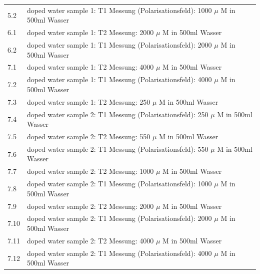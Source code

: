 \begin{tabular}{ll}
           5.2 & doped water sample 1: T1 Messung (Polarisationsfeld): 1000 $\mu$ M in 500ml Wasser \\

           6.1 & doped water sample 1: T2 Messung: 2000 $\mu$ M in 500ml Wasser \\
    
           6.2 & doped water sample 1: T1 Messung (Polarisationsfeld): 2000 $\mu$ M in 500ml Wasser \\

           7.1 & doped water sample 1: T2 Messung: 4000 $\mu$ M in 500ml Wasser \\
    
           7.2 & doped water sample 1: T1 Messung (Polarisationsfeld): 4000 $\mu$ M in 500ml Wasser \\

           7.3 & doped water sample 1: T2 Messung: 250 $\mu$ M in 500ml Wasser \\
    
           7.4 & doped water sample 2: T1 Messung (Polarisationsfeld): 250 $\mu$ M in 500ml Wasser \\
    
           7.5 & doped water sample 2: T2 Messung: 550 $\mu$ M in 500ml Wasser \\
    
           7.6 & doped water sample 2: T1 Messung (Polarisationsfeld): 550 $\mu$ M in 500ml Wasser \\

           7.7 & doped water sample 2: T2 Messung: 1000 $\mu$ M in 500ml Wasser \\
    
           7.8 & doped water sample 2: T1 Messung (Polarisationsfeld): 1000 $\mu$ M in 500ml Wasser \\

           7.9 & doped water sample 2: T2 Messung: 2000 $\mu$ M in 500ml Wasser \\
    
           7.10 & doped water sample 2: T1 Messung (Polarisationsfeld): 2000 $\mu$ M in 500ml Wasser \\

           7.11 & doped water sample 2: T2 Messung: 4000 $\mu$ M in 500ml Wasser \\
    
           7.12 & doped water sample 2: T1 Messung (Polarisationsfeld): 4000 $\mu$ M in 500ml Wasser \\
    \end{tabular}  
     
